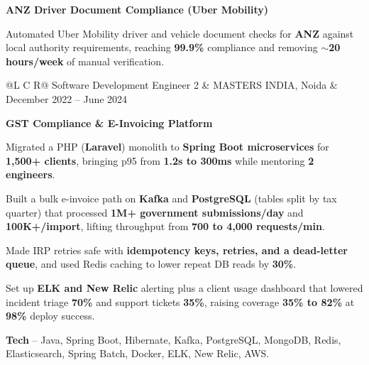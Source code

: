 \textcolor{Project}{\textbf{ANZ Driver Document Compliance (Uber Mobility)}}
\vspace{-1ex}
\begin{zitemize}
    \item Automated Uber Mobility driver and vehicle document checks for \textbf{ANZ} against local authority requirements, reaching \textbf{99.9\%} compliance and removing $\sim$\textbf{20 hours/week} of manual verification.
\end{zitemize}

\vspace{0.1ex}
\noindent
\begin{tabularx}{\textwidth}{@{}L C R@{}}
\textcolor{role}{Software Development Engineer 2} & \textcolor{company}{MASTERS INDIA, Noida} & \textcolor{date}{December 2022 -- June 2024}\\
\end{tabularx}
\vspace{-2.2ex}

\textcolor{Project}{\textbf{GST Compliance \& E-Invoicing Platform}}
\vspace{-1ex}
\begin{zitemize}
    \item Migrated a PHP (\textbf{Laravel}) monolith to \textbf{Spring Boot microservices} for \textbf{1,500+ clients}, bringing p95 from \textbf{1.2s to 300ms} while mentoring \textbf{2 engineers}.
    \item Built a bulk e-invoice path on \textbf{Kafka} and \textbf{PostgreSQL} (tables split by tax quarter) that processed \textbf{1M+ government submissions/day} and \textbf{100K+/import}, lifting throughput from \textbf{700 to 4,000 requests/min}.
    \item Made IRP retries safe with \textbf{idempotency keys, retries, and a dead-letter queue}, and used Redis caching to lower repeat DB reads by \textbf{30\%}.
    \item Set up \textbf{ELK and New Relic} alerting plus a client usage dashboard that lowered incident triage \textbf{70\%} and support tickets \textbf{35\%}, raising coverage \textbf{35\% to 82\%} at \textbf{98\%} deploy success.
    \item \textbf{Tech} -- Java, Spring Boot, Hibernate, Kafka, PostgreSQL, MongoDB, Redis, Elasticsearch, Spring Batch, Docker, ELK, New Relic, AWS.
\end{zitemize}

